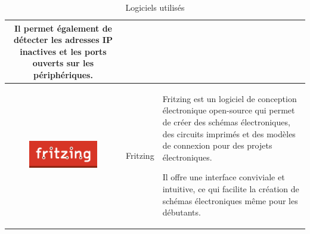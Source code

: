 \begin{table}[H]
\begin{tabular}{|c{3cm}|c{3cm}|l{10cm}|}
Il permet également de détecter les adresses IP inactives et les ports ouverts sur les périphériques.  \\
\hline
\includegraphics[width=3cm]{Images/Logo-Fritzing.png} & Fritzing & Fritzing est un logiciel de conception électronique open-source qui permet de créer des schémas électroniques, des circuits imprimés et des modèles de connexion pour des projets électroniques. 

Il offre une interface conviviale et intuitive, ce qui facilite la création de schémas électroniques même pour les débutants. \\
\hline
\end{tabular}
\caption{Logiciels utilisés}
\label{2}
\end{table}


